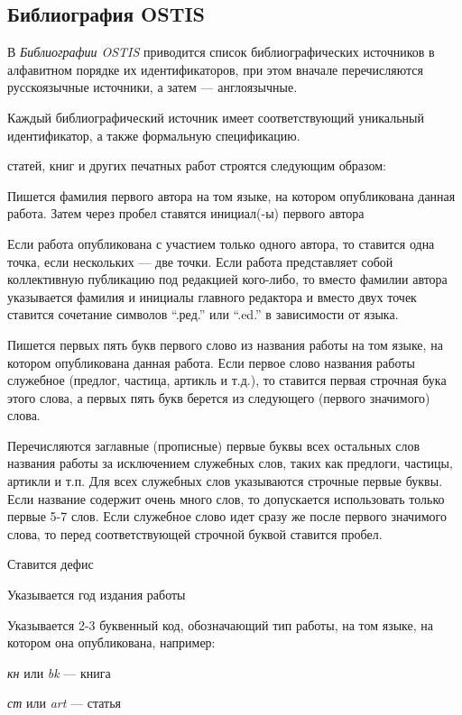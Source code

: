 

\begin{partbacktext}
\part*{Библиография OSTIS}
\label{part_biblio}

В \textit{Библиографии OSTIS} приводится список библиографических источников в алфавитном порядке их идентификаторов, при этом вначале перечисляются русскоязычные источники, а затем --- англоязычные.

Каждый библиографический источник имеет соответствующий уникальный идентификатор, а также формальную спецификацию.

 статей, книг и других печатных работ строятся следующим образом:

\begin{textitemize}
	\item Пишется фамилия первого автора на том языке, на котором опубликована данная работа. Затем через пробел ставятся инициал(-ы) первого автора
	\item Если работа опубликована с участием только одного автора, то ставится одна точка, если нескольких --- две точки. Если работа представляет собой коллективную публикацию под редакцией кого-либо, то вместо фамилии автора указывается фамилия и инициалы главного редактора и вместо двух точек ставится сочетание символов ``.ред.'' или ``.ed.'' в зависимости от языка.
	\item Пишется первых пять букв первого слово из названия работы на том языке, на котором опубликована данная работа. Если первое слово названия работы служебное (предлог, частица, артикль и т.д.), то ставится первая строчная бука этого слова, а первых пять букв берется из следующего (первого значимого) слова.
	\item Перечисляются заглавные (прописные) первые буквы всех остальных слов названия работы за исключением служебных слов, таких как предлоги, частицы, артикли и т.п. Для всех служебных слов указываются строчные первые буквы. Если название содержит очень много слов, то допускается использовать только первые 5-7 слов. Если служебное слово идет сразу же после первого значимого слова, то перед соответствующей строчной буквой ставится пробел.
	\item Ставится дефис
	\item Указывается год издания работы
	\item Указывается 2-3 буквенный код, обозначающий тип работы, на том языке, на котором она опубликована, например:
	\begin{textitemize}
		\item \textit{кн} или \textit{bk} --- книга
		\item \textit{ст} или \textit{art} --- статья
	\end{textitemize}
\end{textitemize}


\end{partbacktext}
